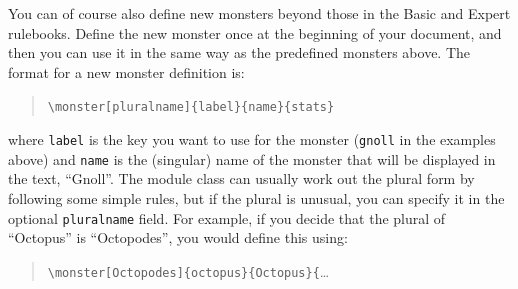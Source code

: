 \documentclass[letterpaper,serif]{module}
\begin{document}
\noindent You can of course also define new monsters beyond those in the Basic and Expert rulebooks. Define the new
monster once at the beginning of your document, and then you can use it in the same way as the predefined
monsters above. The format for a new monster definition is:
\begin{quote}
\verb|\monster[pluralname]{label}{name}{stats}|
\end{quote}
where \verb|label| is the key you want to use for the monster (\verb|gnoll| in the examples above) and
\verb|name| is the (singular) name of the monster that will be displayed in the text, ``Gnoll''. The module
class can usually work out the plural form by following some simple rules, but if the plural is unusual,
you can specify it in the optional \verb|pluralname| field. For example, if you decide that the plural of
``Octopus'' is ``Octopodes'', you would define this using:
\begin{quote}
\verb|\monster[Octopodes]{octopus}{Octopus}{|\ldots
\end{quote}
\end{document}
